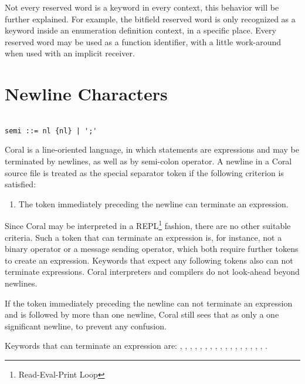 Not every reserved word is a keyword in every context, this behavior will be further explained. For example, the bitfield reserved word is only recognized as a keyword inside an enumeration definition context, in a specific place. Every reserved word may be used as a function identifier, with a little work-around when used with an implicit receiver.

\section{Newline Characters}\label{sec:newlinecharacters}

\syntax\begin{lstlisting}

semi ::= nl {nl} | ';'

\end{lstlisting}

Coral is a line-oriented language, in which statements are expressions and may be terminated by newlines, as well as by semi-colon operator. A newline in a Coral source file is treated as the special separator token \lstinline@nl@ if the following criterion is satisfied:

\begin{enumerate}
\item The token immediately preceding the newline can terminate an expression.
\end{enumerate}

Since Coral may be interpreted in a REPL\footnote{Read-Eval-Print Loop} fashion, there are no other suitable criteria. Such a token that can terminate an expression is, for instance, not a binary operator or a message sending operator, which both require further tokens to create an expression. Keywords that expect any following tokens also can not terminate expressions. Coral interpreters and compilers do not look-ahead beyond newlines.

If the token immediately preceding the newline can not terminate an expression and is followed by more than one newline, Coral still sees that as only a one significant newline, to prevent any confusion.

Keywords that can terminate an expression are: \lstinline@break@, \lstinline@end@, \lstinline@opaque@, \lstinline@native@, \lstinline@next@, \lstinline@nil@, \lstinline@no@, \lstinline@redo@, \lstinline@retry@, \lstinline@return@, \lstinline@self@, \lstinline@skip@, \lstinline@super@, \lstinline@this@, \lstinline@transparent@, \lstinline@void@, \lstinline@yes@, \lstinline@yield@.

